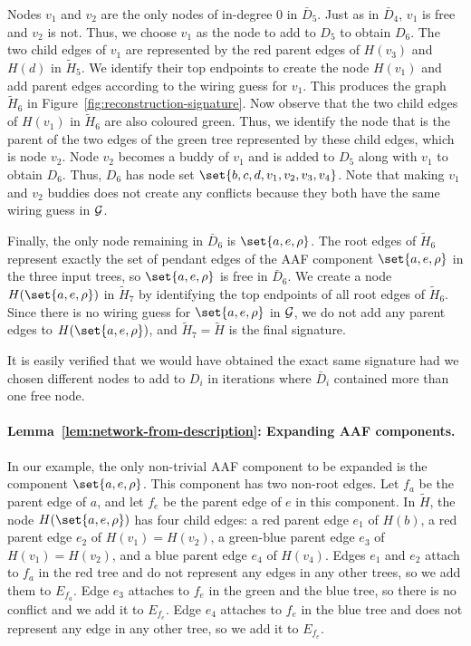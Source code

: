 Nodes $v_1$ and $v_2$ are the only nodes of in-degree $0$ in $\bar D_5$. Just as in $\bar D_4$, $v_1$ is free and $v_2$ is not. Thus, we choose $v_1$ as the node to add  to $D_5$ to obtain $D_6$. The two child edges of $v_1$ are represented by the red parent edges of $H(v_3)$ and $H(d)$ in $\tilde H_5$. We identify their top endpoints to create the node $H(v_1)$ and add parent edges according to the wiring guess for $v_1$. This produces the graph $\tilde H_6$ in Figure~\ref{fig:reconstruction-signature}. Now observe that the two child edges of $H(v_1)$ in $\tilde H_6$ are also coloured green. Thus, we identify the node that is the parent of the two edges of the green tree represented by these child edges, which is node $v_2$. Node $v_2$ becomes a buddy of $v_1$ and is added to $D_5$ along with $v_1$ to obtain $D_6$. Thus, $D_6$ has node set $\set{b, c, d, v_1, v_2, v_3, v_4}$. Note that making $v_1$ and $v_2$ buddies does not create any conflicts because they both have the same wiring guess in $\mathcal{G}$. 

Finally, the only node remaining in $\bar D_6$ is $\set{a, e, \rho}$. The root edges of $\tilde H_6$ represent exactly the set of pendant edges of the AAF component $\set{a, e, \rho}$ in the three input trees, so $\set{a, e, \rho}$ is free in $\bar D_6$. We create a node $H(\set{a, e, \rho})$ in $\tilde H_7$ by identifying the top endpoints of all root edges of $\tilde H_6$. Since there is no wiring guess for $\set{a, e, \rho}$ in $\mathcal{G}$, we do not add any parent edges to $H(\set{a, e, \rho})$, and $\tilde H_7 = \tilde H$ is the final signature.

It is easily verified that we would have obtained the exact same signature had we chosen different nodes to add to $D_i$ in iterations where $\bar D_i$ contained more than one free node.

\paragraph{Lemma~\ref{lem:network-from-description}: Expanding AAF components.}

In our example, the only non-trivial AAF component to be expanded is the component $\set{a, e, \rho}$. This component has two non-root edges. Let $f_a$ be the parent edge of $a$, and let $f_e$ be the parent edge of $e$ in this component. In $\tilde H$, the node $H(\set{a, e, \rho})$ has four child edges: a red parent edge $e_1$ of $H(b)$, a red parent edge $e_2$ of $H(v_1) = H(v_2)$, a green-blue parent edge $e_3$ of $H(v_1) = H(v_2)$, and a blue parent edge $e_4$ of $H(v_4)$. Edges $e_1$ and $e_2$ attach to $f_a$ in the red tree and do not represent any edges in any other trees, so we add them to $E_{f_a}$. Edge $e_3$ attaches to $f_e$ in the green and the blue tree, so there is no conflict and we add it to $E_{f_e}$. Edge $e_4$ attaches to $f_e$ in the blue tree and does not represent any {edge} in any other {tree}, so we add it to $E_{f_e}$. 

